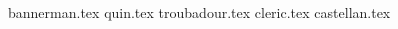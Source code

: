 
\raggedcolumns\begin{multicols}{2}

	\startsortedpricelistNSP
	
	{bannerman.tex}
	{quin.tex}
	{troubadour.tex}
	{cleric.tex}
	{castellan.tex}

	\endsortedpricelistNSP

\end{multicols}